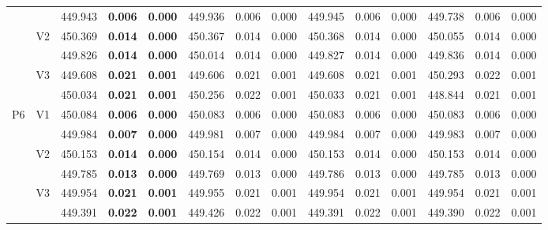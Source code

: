\documentclass[12pt,a4paper]{article}
\begin{document}
\begin{sidewaystable}[ht]
{\begin{tabular}{cc|ccc|ccc|ccc|ccc|}
   &  & 449.943 & \textbf{0.006} & \textbf{0.000} & 449.936 & 0.006 & 0.000 & 449.945 & 0.006 & 0.000 & 449.738 & 0.006 & 0.000 \\ 
   & \multirow{2}{*}{V2} & 450.369 & \textbf{0.014} & \textbf{0.000} & 450.367 & 0.014 & 0.000 & 450.368 & 0.014 & 0.000 & 450.055 & 0.014 & 0.000 \\ 
   &  & 449.826 & \textbf{0.014} & \textbf{0.000} & 450.014 & 0.014 & 0.000 & 449.827 & 0.014 & 0.000 & 449.836 & 0.014 & 0.000 \\ 
   & \multirow{2}{*}{V3} & 449.608 & \textbf{0.021} & \textbf{0.001} & 449.606 & 0.021 & 0.001 & 449.608 & 0.021 & 0.001 & 450.293 & 0.022 & 0.001 \\ 
   &  & 450.034 & \textbf{0.021} & \textbf{0.001} & 450.256 & 0.022 & 0.001 & 450.033 & 0.021 & 0.001 & 448.844 & 0.021 & 0.001 \\ 
   \hline \hline\multirow{6}{*}{P6} & \multirow{2}{*}{V1} & 450.084 & \textbf{0.006} & \textbf{0.000} & 450.083 & 0.006 & 0.000 & 450.083 & 0.006 & 0.000 & 450.083 & 0.006 & 0.000 \\ 
   &  & 449.984 & \textbf{0.007} & \textbf{0.000} & 449.981 & 0.007 & 0.000 & 449.984 & 0.007 & 0.000 & 449.983 & 0.007 & 0.000 \\ 
   & \multirow{2}{*}{V2} & 450.153 & \textbf{0.014} & \textbf{0.000} & 450.154 & 0.014 & 0.000 & 450.153 & 0.014 & 0.000 & 450.153 & 0.014 & 0.000 \\ 
   &  & 449.785 & \textbf{0.013} & \textbf{0.000} & 449.769 & 0.013 & 0.000 & 449.786 & 0.013 & 0.000 & 449.785 & 0.013 & 0.000 \\ 
   & \multirow{2}{*}{V3} & 449.954 & \textbf{0.021} & \textbf{0.001} & 449.955 & 0.021 & 0.001 & 449.954 & 0.021 & 0.001 & 449.954 & 0.021 & 0.001 \\ 
   &  & 449.391 & \textbf{0.022} & \textbf{0.001} & 449.426 & 0.022 & 0.001 & 449.391 & 0.022 & 0.001 & 449.390 & 0.022 & 0.001 \\ 
   \hline
\end{tabular}
}
\end{sidewaystable}
\end{document}
